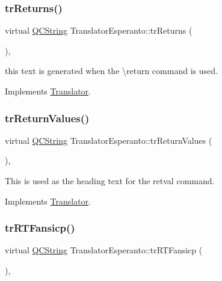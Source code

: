 \subsubsection{\texorpdfstring{trReturns()}{trReturns()}}
{\footnotesize\ttfamily virtual \mbox{\hyperlink{class_q_c_string}{Q\+C\+String}} Translator\+Esperanto\+::tr\+Returns (\begin{DoxyParamCaption}{ }\end{DoxyParamCaption})\hspace{0.3cm}{\ttfamily [inline]}, {\ttfamily [virtual]}}

this text is generated when the \textbackslash{}return command is used. 

Implements \mbox{\hyperlink{class_translator}{Translator}}.

\mbox{\label{class_translator_esperanto_a7d4e9c8f00ac450f74dc37f012a3d1f4}} 
\subsubsection{\texorpdfstring{trReturnValues()}{trReturnValues()}}
{\footnotesize\ttfamily virtual \mbox{\hyperlink{class_q_c_string}{Q\+C\+String}} Translator\+Esperanto\+::tr\+Return\+Values (\begin{DoxyParamCaption}{ }\end{DoxyParamCaption})\hspace{0.3cm}{\ttfamily [inline]}, {\ttfamily [virtual]}}

This is used as the heading text for the retval command. 

Implements \mbox{\hyperlink{class_translator}{Translator}}.

\mbox{\label{class_translator_esperanto_a67812d3ba72d5596dfe4bfb645ac18c7}} 
\subsubsection{\texorpdfstring{trRTFansicp()}{trRTFansicp()}}
{\footnotesize\ttfamily virtual \mbox{\hyperlink{class_q_c_string}{Q\+C\+String}} Translator\+Esperanto\+::tr\+R\+T\+Fansicp (\begin{DoxyParamCaption}{ }\end{DoxyParamCaption})\hspace{0.3cm}{\ttfamily [inline]}, {\ttfamily [virtual]}}

